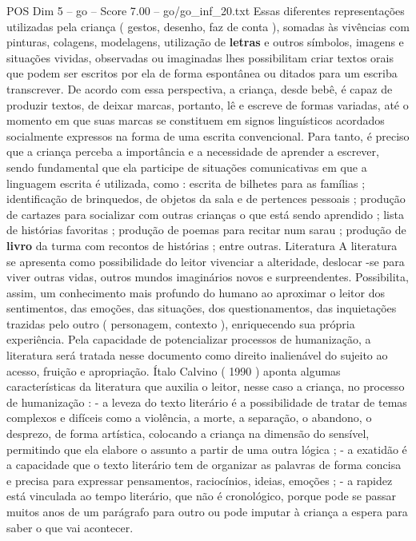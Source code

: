 \begin{textsample}{POS Dim 5 – go – Score 7.00 – go/go\_inf\_20.txt}
Essas diferentes representações utilizadas pela criança ( gestos, desenho, faz de conta ), somadas às vivências com pinturas, colagens, modelagens, utilização de \textbf{letras} e outros símbolos, imagens e situações vividas, observadas ou imaginadas lhes possibilitam criar textos orais que podem ser escritos por ela de forma espontânea ou ditados para um escriba transcrever.
De acordo com essa perspectiva, a criança, desde bebê, é capaz de produzir textos, de deixar marcas, portanto, lê e escreve de formas variadas, até o momento em que suas marcas se constituem em signos linguísticos acordados socialmente expressos na forma de uma escrita convencional.
Para tanto, é preciso que a criança perceba a importância e a necessidade de aprender a escrever, sendo fundamental que ela participe de situações comunicativas em que a linguagem escrita é utilizada, como : escrita de bilhetes para as famílias ; identificação de brinquedos, de objetos da sala e de pertences pessoais ; produção de cartazes para socializar com outras crianças o que está sendo aprendido ; lista de histórias favoritas ; produção de poemas para recitar num sarau ; produção de \textbf{livro} da turma com recontos de histórias ; entre outras.
Literatura A literatura se apresenta como possibilidade do leitor vivenciar a alteridade, deslocar -se para viver outras vidas, outros mundos imaginários novos e surpreendentes.
Possibilita, assim, um conhecimento mais profundo do humano ao aproximar o leitor dos sentimentos, das emoções, das situações, dos questionamentos, das inquietações trazidas pelo outro ( personagem, contexto ), enriquecendo sua própria experiência.
Pela capacidade de potencializar processos de humanização, a literatura será tratada nesse documento como direito inalienável do sujeito ao acesso, fruição e apropriação.
Ítalo Calvino ( 1990 ) aponta algumas características da literatura que auxilia o leitor, nesse caso a criança, no processo de humanização : - a leveza do texto literário é a possibilidade de tratar de temas complexos e difíceis como a violência, a morte, a separação, o abandono, o desprezo, de forma artística, colocando a criança na dimensão do sensível, permitindo que ela elabore o assunto a partir de uma outra lógica ; - a exatidão é a capacidade que o texto literário tem de organizar as palavras de forma concisa e precisa para expressar pensamentos, raciocínios, ideias, emoções ; - a rapidez está vinculada ao tempo literário, que não é cronológico, porque pode se passar muitos anos de um parágrafo para outro ou pode imputar à criança a espera para saber o que vai acontecer.

\end{textsample}
